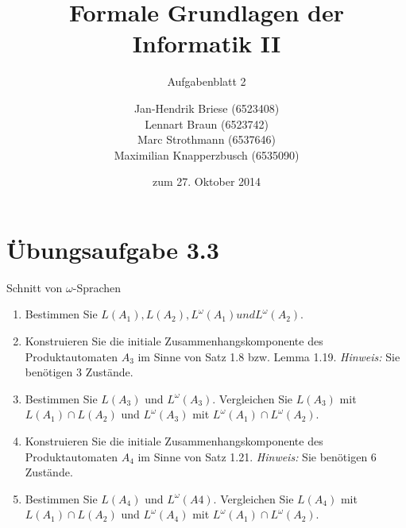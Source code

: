 \documentclass[a4paper]{scrartcl}
\title{Formale Grundlagen der Informatik II}
\subtitle{Aufgabenblatt 2}
\author{
    Jan-Hendrik Briese (6523408) \\
    Lennart Braun (6523742) \\
    Marc Strothmann (6537646) \\
    Maximilian Knapperzbusch (6535090)
}
\date{zum 27. Oktober 2014}
\begin{document}
\maketitle

\section*{Übungsaufgabe 3.3} 
Schnitt von $\omega$-Sprachen
\begin{enumerate}[1.]
    \item Bestimmen Sie $L(A_1 ), L(A_2 ), L^{\omega}(A_1 ) und L^{\omega}(A_2 )$.
    \item Konstruieren Sie die initiale Zusammenhangskomponente des Produktautomaten 
        $A_3$ im Sinne von Satz 1.8 bzw. Lemma 1.19. \textit{Hinweis:} Sie benötigen 
        3 Zustände.
    \item Bestimmen Sie $L(A_3)$ und $L^{\omega}(A_3)$. Vergleichen Sie $L(A_3)$ mit 
        $L(A_1) \cap L(A_2)$ und $L^{\omega}(A_3)$ mit $L^{\omega}(A_1) \cap L^{\omega}(A_2)$.
    \item Konstruieren Sie die initiale Zusammenhangskomponente des Produktautomaten 
        $A_4$ im Sinne von Satz 1.21. \textit{Hinweis:} Sie benötigen 6 Zustände.
    \item Bestimmen Sie $L(A_4)$ und $L^{\omega}(A 4 )$. Vergleichen Sie $L(A_4)$ mit 
        $L(A_1) \cap L(A_2)$ und $L^{\omega}(A_4)$ mit $L^{\omega}(A_1) \cap L^{\omega}(A_2)$.
\end{enumerate}
\end{document}
